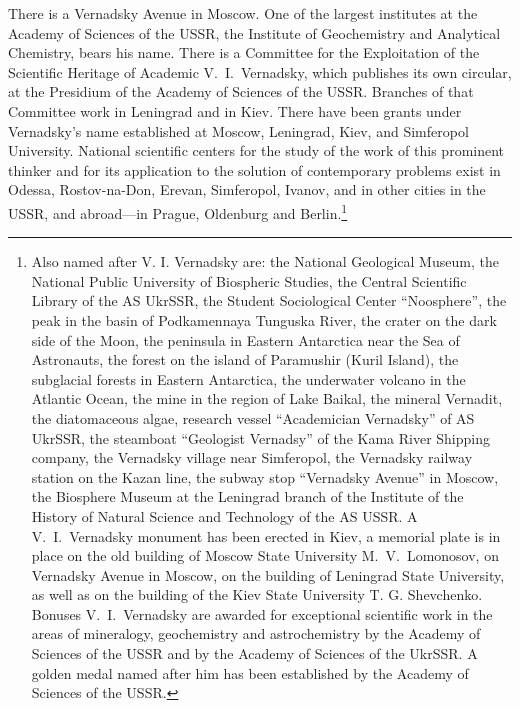 There is a Vernadsky Avenue in Moscow.  One of the largest institutes at the
Academy of Sciences of the USSR, the Institute of Geochemistry and Analytical
Chemistry, bears his name.
There is a Committee for the Exploitation of the Scientific Heritage of
Academic V.~I.\ Vernadsky, which publishes its own circular, at the Presidium
of the Academy of Sciences of the USSR.  Branches of that Committee work in
Leningrad and in Kiev.  There have been grants under Vernadsky's name
established at Moscow, Leningrad, Kiev, and Simferopol University.  National
scientific centers for the study of the work of this prominent thinker and for
its application to the solution of contemporary problems exist in Odessa,
Rostov-na-Don, Erevan, Simferopol, Ivanov, and in other cities in the USSR, and
abroad---in Prague, Oldenburg and Berlin.\footnote{
	Also named after V. I.  Vernadsky are: the National Geological
	Museum, the National
	Public University of Biospheric Studies, the Central Scientific Library
	of the AS UkrSSR,
	the Student Sociological Center ``Noosphere'', the peak in the basin of
	Podkamennaya Tunguska River, the crater on the dark side of the Moon,
	the peninsula in Eastern Antarctica near the Sea of
	Astronauts, the forest on the island of
	Paramushir (Kuril Island), the subglacial forests in Eastern
	Antarctica, the underwater volcano in the Atlantic Ocean, the mine in
	the region of Lake Baikal, the mineral Vernadit, the diatomaceous
	algae, research vessel ``Academician Vernadsky'' of AS UkrSSR, the
	steamboat ``Geologist Vernadsy'' of the
	Kama River Shipping company,
	the Vernadsky village near Simferopol, the Vernadsky railway station on
	the Kazan line, the subway stop ``Vernadsky Avenue'' in Moscow, the
	Biosphere Museum at the Leningrad branch of the Institute of the
	History of Natural Science and Technology of the AS USSR.  A V.~I.\ 
	Vernadsky monument has been erected in Kiev, a memorial plate is in
	place on the old building of Moscow State University M.~V.\ 
	Lomonosov, on Vernadsky Avenue
	in Moscow, on the building of Leningrad State
	University,
	as well as on the building of the Kiev State University T. G.
	Shevchenko.\footnoteRus{Киевского государственного университета им. Т.
	Г.  Шевченко}  Bonuses V.~I.\ Vernadsky are awarded for exceptional
	scientific work in the areas of mineralogy, geochemistry and
	astrochemistry by the Academy of Sciences of the USSR and by the
	Academy of Sciences of the UkrSSR.  A golden medal named after him has
	been established by the Academy of Sciences of the USSR.}


